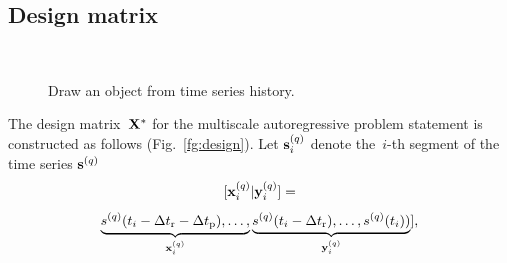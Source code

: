 \documentclass[conference]{IEEEtran}
\begin{document}
\subsection{Design matrix}

\begin{figure}[!ht]
\centering
{} \\
\centering{}
\caption{Draw an object from time series history.}
\end{figure}

The design matrix~${\mathbf{X}}^*$ for the multiscale autoregressive problem statement is constructed  as follows (Fig.~\ref{fg:design}). Let ${\mathbf{s}}^{(q)}_i$ denote the~$i$-th segment of the time series ${\mathbf{s}}^{(q)}$
\begin{equation}\label{eq:segment}
[\bx^{(q)}_i | \by^{(q)}_i] = \end{equation}
\[ \underbrace{s^{(q)}(t_i-\Delta t_\text{r}-\Delta t_\text{p}),\dots,}_{{\mathbf{x}}^{(q)}_i} \underbrace{s^{(q)}(t_i-\Delta t_\text{r}),\dots,s^{(q)}(t_i))}_{{\mathbf{y}}^{(q)}_i}], \]
\end{document}
